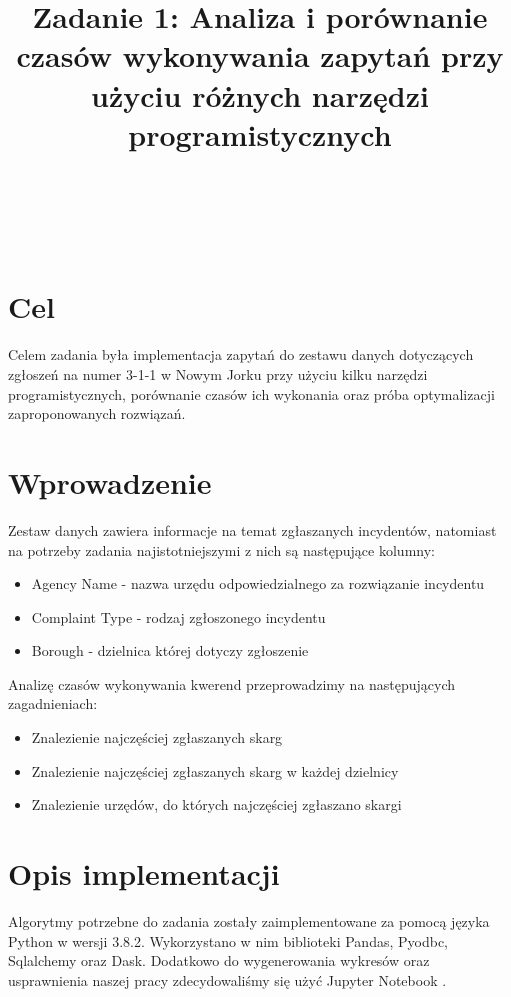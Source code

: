 \documentclass{classrep}
\author{%
  \\
  \studentinfo[234128@edu.p.lodz.pl]{Piotr Wardęcki}{234128}\\
  \studentinfo[234053@edu.p.lodz.pl]{Paweł Galewicz}{234053}\\
  \studentinfo[234067@edu.p.lodz.pl]{Bartosz Jurczewski}{234067}%
}
\title{Zadanie 1: Analiza i porównanie czasów wykonywania zapytań przy użyciu różnych narzędzi programistycznych}
\begin{document}
\maketitle
\thispagestyle{fancyplain}
\clearpage

\section{Cel}
Celem zadania była implementacja zapytań do zestawu danych dotyczących zgłoszeń na numer 3-1-1 w Nowym Jorku \cite{dataset} przy użyciu kilku narzędzi programistycznych, porównanie czasów ich wykonania oraz próba optymalizacji zaproponowanych rozwiązań.

\section{Wprowadzenie}
Zestaw danych zawiera informacje na temat zgłaszanych incydentów, natomiast na potrzeby zadania najistotniejszymi z nich są następujące kolumny:

\begin{itemize}
    \item Agency Name - nazwa urzędu odpowiedzialnego za rozwiązanie incydentu
    \item Complaint Type - rodzaj zgłoszonego incydentu 
    \item Borough - dzielnica której dotyczy zgłoszenie
\end{itemize}

Analizę czasów wykonywania kwerend przeprowadzimy na następujących zagadnieniach:

\begin{itemize}
    \item Znalezienie najczęściej zgłaszanych skarg
    \item Znalezienie najczęściej zgłaszanych skarg w każdej dzielnicy
    \item Znalezienie urzędów, do których najczęściej zgłaszano skargi 
\end{itemize}

\section{Opis implementacji}
Algorytmy potrzebne do zadania zostały zaimplementowane za pomocą języka Python w wersji 3.8.2.
Wykorzystano w nim biblioteki Pandas, Pyodbc, Sqlalchemy oraz Dask.
Dodatkowo do wygenerowania wykresów oraz usprawnienia naszej pracy zdecydowaliśmy się użyć Jupyter Notebook \cite{jupyter}.
\end{document}
